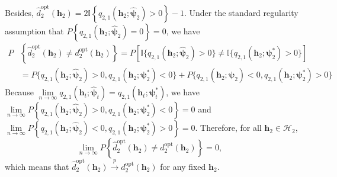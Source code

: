 \documentclass[12pt]{article}
\begin{document}
Besides, $\widehat{d}_2^{\mathrm{opt}}\left(\bm{h}_2\right) = 2\mathbb{I}\left\{q_{2,1}(\bm{h}_2;\widehat{\bm{\psi}}_2)>0\right\} -1$. Under the standard regularity assumption that $P\left\{q_{2,1}(\bm{h}_2;\widehat{\bm{\psi}}_2)=0\right\} = 0$, we have
\begin{align*}
    P&\left\{\widehat{d}_2^{\mathrm{opt}}(\bm{h}_2) \neq d_2^{\mathrm{opt}}(\bm{h}_2)\right\} = P\left[\mathbb{I}\{q_{2,1}(\bm{h}_2;\widehat{\bm{\psi}}_2)>0\} \neq \mathbb{I}\{q_{2,1}(\bm{h}_2;\bm{\psi}^*_2)>0\}\right]\\
    &= P\{q_{2,1}(\bm{h}_2;\widehat{\bm{\psi}}_2)>0, q_{2,1}(\bm{h}_2;\bm{\psi}_2^*)<0\} +  P\{q_{2,1}(\bm{h}_2;\widehat{\bm{\psi}}_2)<0, q_{2,1}(\bm{h}_2;\bm{\psi}_2^*)>0\}
\end{align*}
Because $\lim\limits_{n\to\infty}q_{2,1}(\bm{h}_t;\widehat{\bm{\psi}}_t) = q_{2,1}(\bm{h}_t;\bm{\psi}_t^*)$, we have $\lim\limits_{n\to\infty}P\left\{q_{2,1}(\bm{h}_2;\widehat{\bm{\psi}}_2)>0, q_{2,1}(\bm{h}_2;\bm{\psi}_2^*)<0\right\} = 0$ and $\lim\limits_{n\to\infty}P\left\{q_{2,1}(\bm{h}_2;\widehat{\bm{\psi}}_2)<0, q_{2,1}(\bm{h}_2;\bm{\psi}_2^*)>0\right\} = 0$. Therefore, for all $\bm{h}_2 \in \mathcal{H}_2$,
$$
\lim\limits_{n\to\infty}P\left\{\widehat{d}_2^{\mathrm{opt}}(\bm{h}_2) \neq d_2^{\mathrm{opt}}(\bm{h}_2)\right\} = 0, \quad 
$$
which means that $\widehat{d}_2^{\mathrm{opt}}(\bm{h}_2) \stackrel{p}{\longrightarrow} d_2^{\mathrm{opt}}(\bm{h}_2)$ for any fixed $\bm{h}_2$. 
\end{document}
